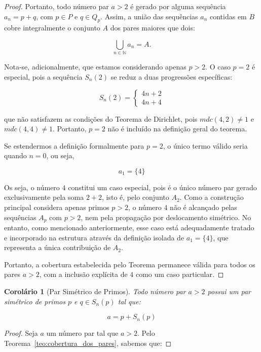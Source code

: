 \documentclass[a4paper,11pt]{article}
\newtheorem{corollary}[theorem]{Corolário}
\theoremstyle{definition}
\theoremstyle{remark}
\begin{document}
\begin{otherlanguage}{brazil}
\begin{proof}
		Portanto, todo número par \(a > 2\) é gerado por alguma sequência \(a_n = p + q\), com \(p \in P\) e \(q \in Q_p\). Assim, a união das sequências \(a_n\) contidas em \(B\) cobre integralmente o conjunto \(A\) dos pares maiores que dois:
		
		\[
		\bigcup_{n \in \mathbb{N}} a_n = A.
		\]
		
			Nota-se, adicionalmente, que estamos considerando apenas \(p > 2\). O caso \(p = 2\) é especial, pois a sequência \(S_n(2)\) se reduz a duas progressões específicas:
		
		\[
		S_n(2) =
		\begin{cases}
			4n + 2 \\
			4n + 4
		\end{cases}
		\]
		
		que não satisfazem as condições do Teorema de Dirichlet, pois \(mdc(4,2) \neq 1\) e \(mdc(4,4) \neq 1\). Portanto, \(p = 2\) não é incluído na definição geral do teorema.
		
		Se estendermos a definição formalmente para \(p = 2\), o único termo válido seria quando \(n = 0\), ou seja,
		
		\[
		a_1 = \{4\}
		\]
		
		Os seja, o número \(4\) constitui um caso especial, pois é o único número par gerado exclusivamente pela soma \(2 + 2\), isto é, pelo conjunto \(A_2\). Como a construção principal considera apenas primos \(p > 2\), o número \(4\) não é alcançado pelas sequências \(A_p\) com \(p > 2\), nem pela propagação por deslocamento simétrico. No entanto, como mencionado anteriormente, esse caso está adequadamente tratado e incorporado na estrutura através da definição isolada de \(a_1 = \{4\}\), que representa a única contribuição de \(A_2\).
		
		Portanto, a cobertura estabelecida pelo Teorema permanece válida para todos os pares \(a > 2\), com a inclusão explícita de \(4\) como um caso particular.
		
	\end{proof}
	

	\begin{corollary}[Par Simétrico de Primos]\label{coro:par_simetrico_primos}
		Todo número par \(a > 2\) possui um par simétrico de primos \(p\) e \(q \in S_n(p)\) tal que:
		
		\[
		a = p + S_n(p)
		\]
	\end{corollary}
	
	\begin{proof}
		Seja \(a\) um número par tal que \(a > 2\). Pelo Teorema~\ref{teo:cobertura_dos_pares}, sabemos que:
		

\end{proof}
\end{otherlanguage}
\end{document}
